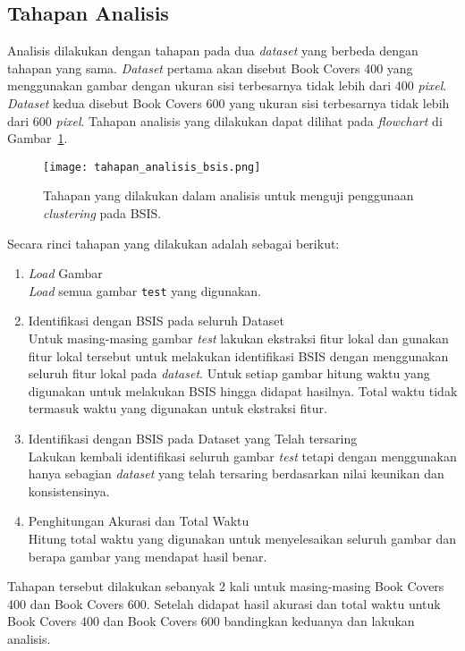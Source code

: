 \subsection{Tahapan Analisis}
Analisis dilakukan dengan tahapan pada dua \textit{dataset} yang berbeda dengan tahapan yang sama. \textit{Dataset} pertama akan disebut Book Covers 400 yang menggunakan gambar dengan ukuran sisi terbesarnya tidak lebih dari 400 \textit{pixel}. \textit{Dataset} kedua disebut Book Covers 600 yang ukuran sisi terbesarnya tidak lebih dari 600 \textit{pixel}. Tahapan analisis yang dilakukan dapat dilihat pada \textit{flowchart} di Gambar~\ref{fig:tahapan_analisis_bsis}.
\begin{figure}[H]
	\centering
	\texttt{[image: tahapan\_analisis\_bsis.png]}
	\caption{Tahapan yang dilakukan dalam analisis untuk menguji penggunaan \textit{clustering} pada BSIS.}
	\label{fig:tahapan_analisis_bsis}
\end{figure}
Secara rinci tahapan yang dilakukan adalah sebagai berikut:
\begin{enumerate}
	\item \textit{Load} Gambar \\
	\textit{Load} semua gambar \texttt{test} yang digunakan.
	\item Identifikasi dengan BSIS pada seluruh Dataset \\
	Untuk masing-masing gambar \textit{test} lakukan ekstraksi fitur lokal dan gunakan fitur lokal tersebut untuk melakukan identifikasi BSIS dengan menggunakan seluruh fitur lokal pada \textit{dataset}. Untuk setiap gambar hitung waktu yang digunakan untuk melakukan BSIS hingga didapat hasilnya. Total waktu tidak termasuk waktu yang digunakan untuk ekstraksi fitur.
	\item Identifikasi dengan BSIS pada Dataset yang Telah tersaring \\
	Lakukan kembali identifikasi seluruh gambar \textit{test} tetapi dengan menggunakan hanya sebagian \textit{dataset} yang telah tersaring berdasarkan nilai keunikan dan konsistensinya.
	\item Penghitungan Akurasi dan Total Waktu \\
	Hitung total waktu yang digunakan untuk menyelesaikan seluruh gambar dan berapa gambar yang mendapat hasil benar.
\end{enumerate}
Tahapan tersebut dilakukan sebanyak 2 kali untuk masing-masing Book Covers 400 dan Book Covers 600. Setelah didapat hasil akurasi dan total waktu untuk Book Covers 400 dan Book Covers 600 bandingkan keduanya dan lakukan analisis.

